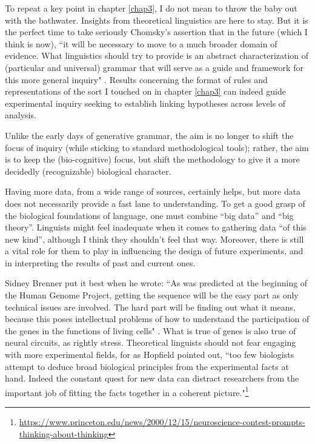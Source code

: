 To repeat a key point in chapter \ref{chap3}, I do not mean to throw the baby out with the bathwater. Insights from theoretical linguistics are here to stay. But it is the perfect time to take seriously Chomsky's assertion that in the future (which I think is now), ``it will be necessary to move to a much broader domain of evidence. What linguistics should try to provide is an abstract characterization of (particular and universal) grammar that will serve as a guide and framework for this more general inquiry" \citep{chomsky1981lectures}. Results concerning the format of rules and representations of the sort I touched on in chapter \ref{chap3} can indeed guide experimental inquiry seeking to establish linking hypotheses across levels of analysis. 

Unlike the early days of generative grammar, the aim is no longer to shift the focus of inquiry (while sticking to standard methodological tools); rather, the aim is to keep the (bio-cognitive) focus, but shift the methodology to give it a more decidedly (recognizable) biological character. 

Having more data, from a wide range of sources, certainly helps, but more data does not necessarily provide a fast lane to understanding. To get a good grasp of the biological foundations of language, one must combine ``big data'' and ``big theory''. Linguists might feel inadequate when it comes to gathering  data ``of this new kind'', although I think they shouldn’t feel that way. Moreover, there is still a vital role for them to play in influencing the design of future experiments, and in interpreting the results of past and current ones.

Sidney Brenner put it best when he wrote: ``As was predicted at the beginning of the Human Genome Project, getting the sequence will be the easy part as only technical issues are involved. The hard part will be finding out what it means, because this poses intellectual problems of how to understand the participation of the genes in the functions of living cells" \citep{brenner1995loose}. What is true of genes is also true of neural circuits, as \cite{krakauer2017neuroscience} rightly stress. Theoretical linguists should not fear engaging with more experimental fields, for as Hopfield pointed out, ``too few biologists attempt to deduce broad biological principles from the experimental facts at hand. Indeed the constant quest for new data can distract researchers from the important job of fitting the facts together in a coherent picture."\footnote{\url{https://www.princeton.edu/news/2000/12/15/neuroscience-contest-prompts-thinking-about-thinking}}

